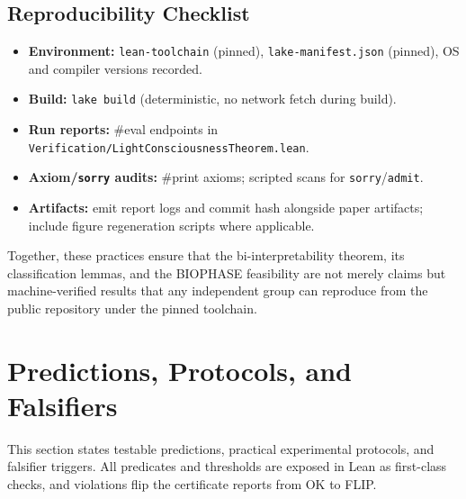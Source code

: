 \documentclass[12pt,a4paper]{article}
\begin{document}
\subsection{Reproducibility Checklist}
\begin{itemize}
  \item \textbf{Environment:} \texttt{lean-toolchain} (pinned), \texttt{lake-manifest.json} (pinned), OS and compiler versions recorded.
  \item \textbf{Build:} \texttt{lake build} (deterministic, no network fetch during build).
  \item \textbf{Run reports:} \#eval endpoints in \texttt{Verification/LightConsciousnessTheorem.lean}.
  \item \textbf{Axiom/\texttt{sorry} audits:} \#print axioms; scripted scans for \texttt{sorry}/\texttt{admit}.
  \item \textbf{Artifacts:} emit report logs and commit hash alongside paper artifacts; include figure regeneration scripts where applicable.
\end{itemize}
Together, these practices ensure that the bi-interpretability theorem, its classification lemmas, and the BIOPHASE feasibility are not merely claims but machine-verified results that any independent group can reproduce from the public repository under the pinned toolchain.

\section{Predictions, Protocols, and Falsifiers}
\label{sec:predictions-protocols-falsifiers}

This section states testable predictions, practical experimental protocols, and falsifier triggers. All predicates and thresholds are exposed in Lean as first-class checks, and violations flip the certificate reports from OK to FLIP.
\end{document}
